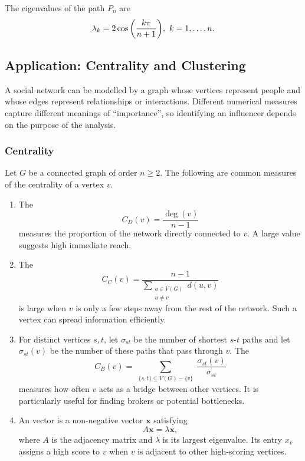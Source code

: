 The eigenvalues of the path $P_n$ are
\begin{equation*}
\lambda_k = 2 \cos \pqty{\dfrac{k\pi}{n + 1}},~ k = 1, \ldots, n.
\end{equation*}


\subsection{Application: Centrality and Clustering}\label{subsec:Centrality}

A social network can be modelled by a graph whose vertices represent people and whose edges represent relationships or interactions. Different numerical measures capture different meanings of ``importance'', so identifying an influencer depends on the purpose of the analysis.

\subsubsection{Centrality}

Let $G$ be a connected graph of order $n \ge 2$. The following are common measures of the centrality of a vertex $v$.
\begin{enumerate}[label=(\roman*)]
\item The 
\begin{equation*}
    C_D(v)=\frac{\deg(v)}{n-1}
\end{equation*}
measures the proportion of the network directly connected to $v$. A large value suggests high immediate reach.

\item The 
\begin{equation*}
    C_C(v)=\frac{n-1}{\displaystyle\sum_{\substack{u\in V(G)\\u\ne v}}d(u,v)}
\end{equation*}
is large when $v$ is only a few steps away from the rest of the network. Such a vertex can spread information efficiently.

\item For distinct vertices $s,t$, let $\sigma_{st}$ be the number of shortest $s$-$t$ paths and let $\sigma_{st}(v)$ be the number of these paths that pass through $v$. The 
\begin{equation*}
    C_B(v)=\sum_{\substack{\{s,t\}\subseteq V(G)-\{v\}}}
    \frac{\sigma_{st}(v)}{\sigma_{st}}
\end{equation*}
measures how often $v$ acts as a bridge between other vertices. It is particularly useful for finding brokers or potential bottlenecks.

\item An  vector is a non-negative vector $\mathbf{x}$ satisfying
\begin{equation*}
    A\mathbf{x}=\lambda\mathbf{x},
\end{equation*}
where $A$ is the adjacency matrix and $\lambda$ is its largest eigenvalue. Its entry $x_v$ assigns a high score to $v$ when $v$ is adjacent to other high-scoring vertices.
\end{enumerate}

